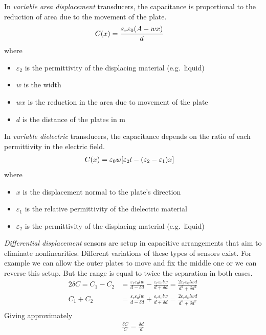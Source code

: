 In \emph{variable area displacement} transducers, the capacitance is proportional to the reduction of area due to the movement of the plate.
\begin{align}
  C(x) &= \frac{\varepsilon_r\varepsilon_0\pqty{A-wx}}{d}\label{eqn:var_ar_displace}
\end{align}
where
\begin{itemize}
  \item $\varepsilon_2$ is the permittivity of the displacing material (e.g.\ liquid)
  \item $w$ is the width
  \item $wx$ is the reduction in the area due to movement of the plate
  \item $d$ is the distance of the plates in \si{\meter}
\end{itemize}

In \emph{variable dielectric} transducers, the capacitance depends on the ratio of each permittivity in the electric field.
\begin{align}
  C(x) &= \varepsilon_0 w \bqty{\varepsilon_2 l - \pqty{\varepsilon_2-\varepsilon_1}x}\label{eqn:var_diel_displace}
\end{align}
where
\begin{itemize}
  \item $x$ is the displacement normal to the plate's direction
  \item $\varepsilon_1$ is the relative permittivity of the dielectric material
  \item $\varepsilon_2$ is the permittivity of the displacing material (e.g.\ liquid)
\end{itemize}

\emph{Differential displacement} sensors are setup in capacitive arrangements that aim to eliminate nonlinearities. Different variations of these types of sensors exist. For example we can allow the outer plates to move and fix the middle one or we can reverse this setup. But the range is equal to twice the separation in both cases.
\begin{align*}
  2\delta C = C_1-C_2 &= \frac{\varepsilon_r\varepsilon_0 lw}{d-\delta d} - \frac{\varepsilon_r\varepsilon_0 lw}{d+\delta d} = \frac{2\varepsilon_r\varepsilon_0 lwd}{d^2+\delta d^2}\\
  C_1+C_2 &= \frac{\varepsilon_r\varepsilon_0 lw}{d-\delta d} + \frac{\varepsilon_r\varepsilon_0 lw}{d+\delta d} = \frac{2\varepsilon_r\varepsilon_0 lwd}{d^2+\delta d^2}\\
\end{align*}
Giving approximately
\begin{align}
  \frac{\delta C}{C} = \frac{\delta d}{d}
\end{align}

